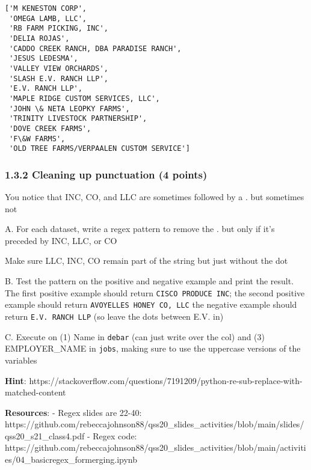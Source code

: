 \documentclass[11pt]{article}
\makeatletter
\newcommand{\boxspacing}{\kern\kvtcb@left@rule\kern\kvtcb@boxsep}
\newcommand{\prompt}[4]{
        {\ttfamily\llap{{\color{#2}[#3]:\hspace{3pt}#4}}\vspace{-\baselineskip}}
    }
\makeatother
\begin{document}
            \begin{tcolorbox}[breakable, size=fbox, boxrule=.5pt, pad at break*=1mm, opacityfill=0]
\prompt{Out}{outcolor}{168}{\boxspacing}
\begin{Verbatim}[commandchars=\\\{\}]
['M KENESTON CORP',
 'OMEGA LAMB, LLC',
 'RB FARM PICKING, INC',
 'DELIA ROJAS',
 'CADDO CREEK RANCH, DBA PARADISE RANCH',
 'JESUS LEDESMA',
 'VALLEY VIEW ORCHARDS',
 'SLASH E.V. RANCH LLP',
 'E.V. RANCH LLP',
 'MAPLE RIDGE CUSTOM SERVICES, LLC',
 'JOHN \& NETA LEOPKY FARMS',
 'TRINITY LIVESTOCK PARTNERSHIP',
 'DOVE CREEK FARMS',
 'F\&W FARMS',
 'OLD TREE FARMS/VERPAALEN CUSTOM SERVICE']
\end{Verbatim}
\end{tcolorbox}
        
    \hypertarget{cleaning-up-punctuation-4-points}{%
\subsubsection{1.3.2 Cleaning up punctuation (4
points)}\label{cleaning-up-punctuation-4-points}}

You notice that INC, CO, and LLC are sometimes followed by a . but
sometimes not

A. For each dataset, write a regex pattern to remove the . but only if
it's preceded by INC, LLC, or CO

Make sure LLC, INC, CO remain part of the string but just without the
dot

B. Test the pattern on the positive and negative example and print the
result. The first positive example should return
\texttt{CISCO\ PRODUCE\ INC}; the second positive example should return
\texttt{AVOYELLES\ HONEY\ CO,\ LLC} the negative example should return
\texttt{E.V.\ RANCH\ LLP} (so leave the dots between E.V. in)

C. Execute on (1) Name in \texttt{debar} (can just write over the col)
and (3) EMPLOYER\_NAME in \texttt{jobs}, making sure to use the
uppercase versions of the variables

\textbf{Hint}:
https://stackoverflow.com/questions/7191209/python-re-sub-replace-with-matched-content

\textbf{Resources}: - Regex slides are 22-40:
https://github.com/rebeccajohnson88/qss20\_slides\_activities/blob/main/slides/qss20\_s21\_class4.pdf
- Regex code:
https://github.com/rebeccajohnson88/qss20\_slides\_activities/blob/main/activities/04\_basicregex\_formerging.ipynb
\end{document}

